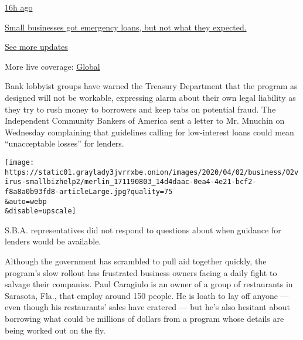 \href{https://www.nytimes3xbfgragh.onion/live/2020/08/03/business/stock-market-today-coronavirus?action=click\&pgtype=Article\&state=default\&region=MAIN_CONTENT_1\&context=storylines_live_updates\#small-businesses-got-emergency-loans-but-not-what-they-expected}{16h
ago}

\href{https://www.nytimes3xbfgragh.onion/live/2020/08/03/business/stock-market-today-coronavirus?action=click\&pgtype=Article\&state=default\&region=MAIN_CONTENT_1\&context=storylines_live_updates\#small-businesses-got-emergency-loans-but-not-what-they-expected}{Small
businesses got emergency loans, but not what they expected.}

\href{https://www.nytimes3xbfgragh.onion/live/2020/08/03/business/stock-market-today-coronavirus?action=click\&pgtype=Article\&state=default\&region=MAIN_CONTENT_1\&context=storylines_live_updates}{See
more updates}

More live coverage:
\href{https://www.nytimes3xbfgragh.onion/2020/08/04/world/coronavirus-covid-19.html?action=click\&pgtype=Article\&state=default\&region=MAIN_CONTENT_1\&context=storylines_live_updates}{Global}

Bank lobbyist groups have warned the Treasury Department that the
program as designed will not be workable, expressing alarm about their
own legal liability as they try to rush money to borrowers and keep tabs
on potential fraud. The Independent Community Bankers of America sent a
letter to Mr. Mnuchin on Wednesday complaining that guidelines calling
for low-interest loans could mean ``unacceptable losses'' for lenders.

\texttt{[image: https://static01.graylady3jvrrxbe.onion/images/2020/04/02/business/02virus-smallbizhelp2/merlin\_171190803\_14d4daac-0ea4-4e21-bcf2-f8a8a0b93fd8-articleLarge.jpg?quality=75\\\&auto=webp\\\&disable=upscale]}

S.B.A. representatives did not respond to questions about when guidance
for lenders would be available.

Although the government has scrambled to pull aid together quickly, the
program's slow rollout has frustrated business owners facing a daily
fight to salvage their companies. Paul Caragiulo is an owner of a group
of restaurants in Sarasota, Fla., that employ around 150 people. He is
loath to lay off anyone --- even though his restaurants' sales have
cratered --- but he's also hesitant about borrowing what could be
millions of dollars from a program whose details are being worked out on
the fly.

